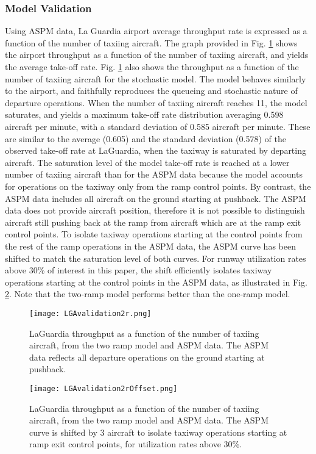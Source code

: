 \documentclass[letterpaper]{article}
\begin{document}
\subsubsection{Model Validation}
Using ASPM data, La Guardia airport average throughput rate is expressed as a function of the number of taxiing aircraft. The graph provided in
  Fig. \ref{loadGraph21} shows the airport throughput as a function of the number of taxiing aircraft, and yields the average take-off rate.
Fig. \ref{loadGraph21}  also shows the throughput as a function of the number of taxiing aircraft for the stochastic model.
The model behaves similarly to the airport, and faithfully reproduces the queueing and stochastic nature of departure operations. 
When the number of taxiing aircraft reaches 11, the model saturates, and yields a maximum take-off rate distribution averaging 0.598 
aircraft per minute, with a standard deviation of 0.585 aircraft per minute. These are similar to the average (0.605) and the standard 
deviation (0.578) of the observed take-off rate at LaGuardia, when the taxiway is saturated by departing aircraft. The saturation level of the 
model take-off rate is reached at a lower number of taxiing aircraft than for the ASPM data because the model accounts for operations
 on the taxiway only from the ramp control points. By contrast, the ASPM data includes all aircraft on the ground starting at pushback.
  The ASPM data does not provide aircraft position, therefore it is not possible to distinguish aircraft still pushing back at the ramp 
  from aircraft which are at the ramp exit control points. To isolate taxiway operations starting at the control points from the rest of
   the ramp operations in the ASPM data, the ASPM curve has been shifted to match the saturation level of both curves. For runway utilization
    rates above 30\% of interest in this paper, the shift efficiently isolates taxiway operations starting at the control points in the ASPM data, as illustrated 
    in Fig. \ref{loadGraph22}. Note that the two-ramp model performs better than the one-ramp model.  


\begin{figure}[ht]
\centering
\texttt{[image: LGAvalidation2r.png]}
\caption{LaGuardia throughput as a function of the number of taxiing aircraft, from the two ramp model and ASPM data. The ASPM data reflects all departure operations on the ground starting at pushback.}
\label{loadGraph21}
\end{figure}


\begin{figure}[ht]
\centering
\texttt{[image: LGAvalidation2rOffset.png]}
\caption{LaGuardia throughput as a function of the number of taxiing aircraft, from the two ramp model and ASPM data. The ASPM curve is shifted by 3 aircraft to isolate taxiway operations starting at ramp exit control points, for utilization rates above 30\%.}
\label{loadGraph22}
\end{figure}
\end{document}
